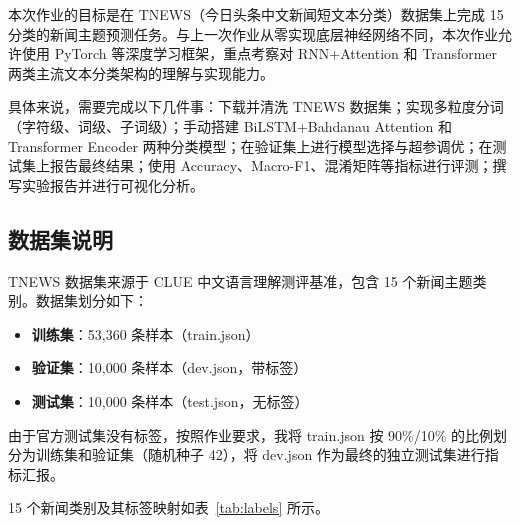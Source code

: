 \documentclass[a4paper]{article}
\begin{document}
本次作业的目标是在 TNEWS（今日头条中文新闻短文本分类）数据集上完成 15 分类的新闻主题预测任务。与上一次作业从零实现底层神经网络不同，本次作业允许使用 PyTorch 等深度学习框架，重点考察对 RNN+Attention 和 Transformer 两类主流文本分类架构的理解与实现能力。

具体来说，需要完成以下几件事：下载并清洗 TNEWS 数据集；实现多粒度分词（字符级、词级、子词级）；手动搭建 BiLSTM+Bahdanau Attention 和 Transformer Encoder 两种分类模型；在验证集上进行模型选择与超参调优；在测试集上报告最终结果；使用 Accuracy、Macro-F1、混淆矩阵等指标进行评测；撰写实验报告并进行可视化分析。

\subsection{数据集说明}

TNEWS 数据集来源于 CLUE 中文语言理解测评基准，包含 15 个新闻主题类别。数据集划分如下：

\begin{itemize}
    \item \textbf{训练集}：53,360 条样本（train.json）
    \item \textbf{验证集}：10,000 条样本（dev.json，带标签）
    \item \textbf{测试集}：10,000 条样本（test.json，无标签）
\end{itemize}

由于官方测试集没有标签，按照作业要求，我将 train.json 按 90\%/10\% 的比例划分为训练集和验证集（随机种子 42），将 dev.json 作为最终的独立测试集进行指标汇报。

15 个新闻类别及其标签映射如表~\ref{tab:labels} 所示。
\end{document}
